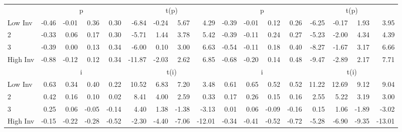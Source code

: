 \begin{table}[!ht]
\begin{tabular}{lrrrrrrrrrrrrrrrr}
  
    
      & \multicolumn{4}{c}{p} & \multicolumn{4}{c}{t(p)}
    
      & \multicolumn{4}{c}{p} & \multicolumn{4}{c}{t(p)}
    
    \\
      \cmidrule(r){2-5} \cmidrule(r){6-9} \cmidrule(r){10-13} \cmidrule(r){14-17}

    Low Inv   & -0.46  & -0.01  & 0.36  & 0.30  & -6.84  & -0.24  & 5.67  & 4.29  & -0.39  & -0.01  & 0.12  & 0.26  & -6.25  & -0.17  & 1.93  & 3.95  \\
           2  & -0.33  & 0.06  & 0.17  & 0.30  & -5.71  & 1.44  & 3.78  & 5.42  & -0.39  & -0.11  & 0.24  & 0.27  & -5.23  & -2.00  & 4.34  & 4.39  \\
           3  & -0.39  & 0.00  & 0.13  & 0.34  & -6.00  & 0.10  & 3.00  & 6.63  & -0.54  & -0.11  & 0.18  & 0.40  & -8.27  & -1.67  & 3.17  & 6.66  \\
    High Inv  & -0.88  & -0.12  & 0.12  & 0.34  & -11.87  & -2.03  & 2.62  & 6.85  & -0.68  & -0.20  & 0.14  & 0.48  & -9.47  & -2.89  & 2.17  & 7.71  \\

  
    
      & \multicolumn{4}{c}{i} & \multicolumn{4}{c}{t(i)}
    
      & \multicolumn{4}{c}{i} & \multicolumn{4}{c}{t(i)}
    
    \\
      \cmidrule(r){2-5} \cmidrule(r){6-9} \cmidrule(r){10-13} \cmidrule(r){14-17}

    Low Inv   & 0.63  & 0.34  & 0.40  & 0.22  & 10.52  & 6.83  & 7.20  & 3.48  & 0.61  & 0.65  & 0.52  & 0.52  & 11.22  & 12.69  & 9.12  & 9.04  \\
           2  & 0.42  & 0.16  & 0.10  & 0.02  & 8.41  & 4.00  & 2.59  & 0.33  & 0.17  & 0.26  & 0.15  & 0.16  & 2.55  & 5.22  & 3.19  & 3.00  \\
           3  & 0.25  & 0.06  & -0.05  & -0.14  & 4.40  & 1.38  & -1.38  & -3.13  & 0.01  & 0.06  & -0.09  & -0.16  & 0.15  & 1.06  & -1.89  & -3.02  \\
    High Inv  & -0.15  & -0.22  & -0.28  & -0.52  & -2.30  & -4.40  & -7.06  & -12.01  & -0.34  & -0.41  & -0.52  & -0.72  & -5.28  & -6.90  & -9.35  & -13.01  \\

  

  \bottomrule
\end{tabular}
\label{tbl:32_Size_OP_Inv_F16}
\end{table}